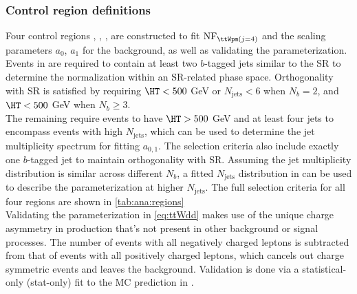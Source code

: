 \documentclass[../thesis.tex]{subfiles}
\begin{document}
\subsubsection*{Control region definitions}
Four control regions \CRttWp, \CRttWm, \CRonebp, \CRonebm are constructed to fit $\mathrm{NF}_{\ttWpm(j=4)}$ and the scaling parameters $a_0$, $a_1$ for the \ttW background, as well as validating the parameterization.\\
Events in \CRttWpm are required to contain at least two $b$-tagged jets similar to the SR to determine the \ttW normalization within an SR-related phase space. Orthogonality with SR is satisfied by requiring $\HT<500$ GeV or $N_\mathrm{jets}<6$ when $N_b=2$, and $\HT<500$ GeV when $N_b\geq 3$.\\
The remaining \CRonebpm require events to have $\HT>500$ GeV and at least four jets to encompass events with high $N_\mathrm{jets}$, which can be used to determine the \ttW jet multiplicity spectrum for fitting $a_{0,1}$. The selection criteria also include exactly one $b$-tagged jet to maintain orthogonality with SR. Assuming the \ttW jet multiplicity distribution is similar across different $N_b$, a fitted $N_\mathrm{jets}$ distribution in \CRonebpm can be used to describe the \ttW parameterization at higher $N_\mathrm{jets}$. The full selection criteria for all four regions are shown in \autoref{tab:ana:regions}\\

Validating the \ttW parameterization in \autoref{eq:ttWdd} makes use of the unique charge asymmetry in \ttW production that's not present in other background or signal processes. The number of events with all negatively charged leptons is subtracted from that of events with all positively charged leptons, which cancels out charge symmetric events and leaves the \ttW background. Validation is done via a statistical-only (stat-only) fit to the \ttW MC prediction in \CRonebpm.


\end{document}
